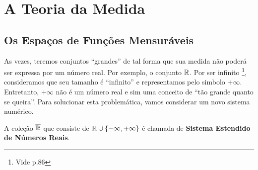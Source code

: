 \chapter{A Teoria da Medida}
\section{Os Espaços de Funções Mensuráveis}

    As vezes, teremos conjuntos \enquote{grandes} de tal forma que sua medida não poderá ser expressa por um número real.
    Por exemplo, o conjunto $\mathbb{R}$.
    Por ser infinito 
    \footnote{Vide \supercite{elon}{p.86}},
    consideramos que seu tamanho é \enquote{infinito} e representamos pelo simbolo $+\infty$.
    Entretanto, $+\infty$ não é um número real e sim uma conceito de \enquote{tão grande quanto se queira}.
    Para solucionar esta problemática, vamos considerar um novo sistema numérico.

    \begin{definition}
    \label{def:reta-estendida}
        A coleção $\operatorname{\overline{\mathbb{R}}}$ que consiste de $\mathbb{R} \cup \{-\infty, +\infty\}$ é chamada de \textbf{Sistema Estendido de Números Reais}.
    \end{definition}


